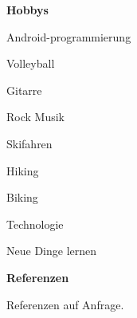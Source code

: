 \documentclass[a4paper,12pt,final]{memoir}
\newcommand{\SmallSep}{\vspace{0.5em}}
\newcommand{\CVSection}[1]
	{\Large\textbf{#1}\par
	\SmallSep\normalsize\normalfont}
\begin{document}
\CVSection{Hobbys}
\begin{compactitem}[\color{MidnightBlue}$\circ$]
	\item Android-programmierung
	\item Volleyball
	\item Gitarre 
	\item Rock Musik
	\item Skifahren
	\item Hiking
	\item Biking
	\item Technologie
	\item Neue Dinge lernen
\end{compactitem}
\SmallSep

\CVSection{Referenzen}
Referenzen auf Anfrage.

\clearpage
\framebreak

\end{document}
